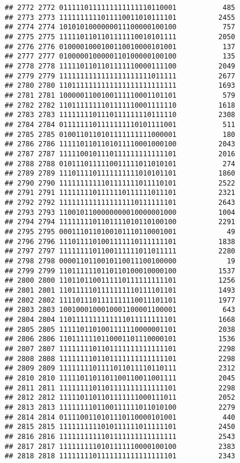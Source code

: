 \documentclass[]{article}
\begin{document}
\begin{verbatim}
## 2772 2772 0111110111111111111110110001           485
## 2773 2773 1111111111011110011010111101          2455
## 2774 2774 1010101000000011100000100100           757
## 2775 2775 1111101101101111110010101111          2050
## 2776 2776 0100001000100110010000101001           137
## 2777 2777 0100000100000110100000100100           135
## 2778 2778 1111101101101111110000111100          2049
## 2779 2779 1111111111111111111111011111          2677
## 2780 2780 1101111111111111111111111111          1693
## 2781 2781 1000001100100111110001101101           579
## 2782 2782 1101111111101111110001111110          1618
## 2783 2783 1111111101110111111110111110          2308
## 2784 2784 0111111101111111110101111001           511
## 2785 2785 0100110110101111111111000001           180
## 2786 2786 1111101101101011110001000100          2043
## 2787 2787 1111100101110111111111111101          2016
## 2788 2788 0101110111110011111011010101           274
## 2789 2789 1110111101111111111010101101          1860
## 2790 2790 1111111111101111111011110101          2522
## 2791 2791 1111111101111110111111011101          2321
## 2792 2792 1111111111111111110111111101          2643
## 2793 2793 1100101100000000010000001000          1004
## 2794 2794 1111111101101111010110100100          2291
## 2795 2795 0001110110100101110110001001            49
## 2796 2796 1110111101001111110111111101          1838
## 2797 2797 1111111101100111111011011111          2280
## 2798 2798 0000110110010110011100100000            19
## 2799 2799 1101111110110110100010000100          1537
## 2800 2800 1101101100111110111111111101          1256
## 2801 2801 1101111101111111110111101101          1493
## 2802 2802 1111011101111111110011101101          1977
## 2803 2803 1001000100010001100001100001           643
## 2804 2804 1101111111111111011111111101          1668
## 2805 2805 1111101101001111110000001101          2038
## 2806 2806 1101111110110001101110000101          1536
## 2807 2807 1111111101101111111111111101          2298
## 2808 2808 1111111101101111111111111101          2298
## 2809 2809 1111111101111011011110110111          2312
## 2810 2810 1111101101101100110011001111          2045
## 2811 2811 1111111101101111111111111101          2298
## 2812 2812 1111101101101111111000111011          2052
## 2813 2813 1111111101100111111011010100          2279
## 2814 2814 0111100110101110110000101001           440
## 2815 2815 1111111111010111111011111101          2450
## 2816 2816 1111111111101111111111111111          2543
## 2817 2817 1111111110101111110000100100          2383
## 2818 2818 1111111101111111111111111101          2343

\end{verbatim}
\end{document}
